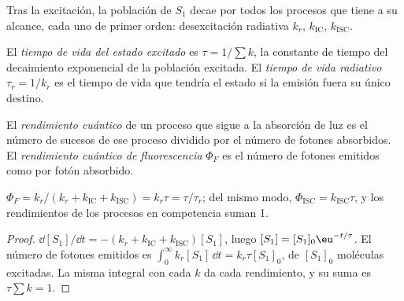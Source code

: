 Tras la excitación, la población de $S_1$ decae por todos los procesos que tiene a su alcance,
cada uno de primer orden: desexcitación radiativa $k_r$,  $k_{\mathrm{IC}}$,
 $k_{\mathrm{ISC}}$.

\begin{definition}\label{def:b3:electronic-spectroscopy:lifetime}
El \emph{tiempo de vida del estado excitado} es $\tau =
1/\sum k$, la constante de tiempo del decaimiento exponencial de la población
excitada. El \emph{tiempo de vida radiativo} $\tau_r =
1/k_r$ es el tiempo de vida que tendría el estado si la emisión fuera su único
destino.
\end{definition}

\begin{definition}\label{def:b3:electronic-spectroscopy:quantum-yield}
El \emph{rendimiento cuántico} de un proceso que sigue a la
absorción de luz es el número de sucesos de ese proceso dividido por el
número de fotones absorbidos. El \emph{rendimiento cuántico de
fluorescencia} $\Phi_F$ es el número de fotones
emitidos como  por fotón absorbido.
\end{definition}

\begin{proposition}\label{prop:b3:electronic-spectroscopy:quantum-yield}
$\Phi_F = k_r/(k_r + k_{\mathrm{IC}} + k_{\mathrm{ISC}}) = k_r\tau = \tau/\tau_r$; del mismo modo,
$\Phi_{\mathrm{ISC}} = k_{\mathrm{ISC}}\tau$, y los rendimientos de los procesos en competencia
suman 1.
\end{proposition}

\begin{proof}
$\dd[S_1]/\dd t = -(k_r + k_{\mathrm{IC}} + k_{\mathrm{ISC}})[S_1]$, luego $[S_1] = [S_1]_0\eu^{-t/\tau}$.
El número de fotones emitidos es $\int_0^\infty k_r[S_1]\,\dd t = k_r\tau[S_1]_0$, de
$[S_1]_0$ moléculas excitadas. La misma integral con cada $k$ da cada rendimiento,
y su suma es $\tau\sum k = 1$.
\end{proof}


